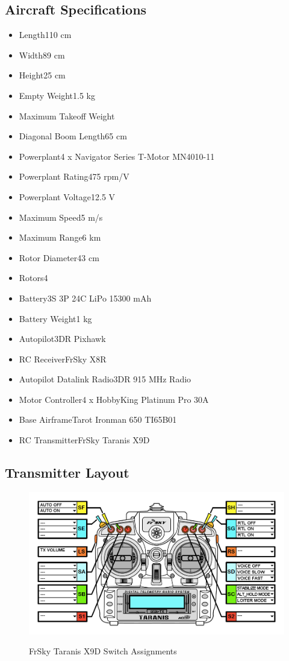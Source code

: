 \documentclass{report}
\begin{document}
		\subsection{Aircraft Specifications}
			\begin{itemize}
				\item Length\hfill110 cm
				\item Width\hfill89 cm
				\item Height\hfill25 cm
				\item Empty Weight\hfill1.5 kg
				\item Maximum Takeoff Weight\hfill
				\item Diagonal Boom Length\hfill65 cm
				\item Powerplant\hfill 4 x Navigator Series T-Motor MN4010-11
				\item Powerplant Rating\hfill475 rpm/V
				\item Powerplant Voltage\hfill12.5 V
				\item Maximum Speed\hfill 5 m/s
				\item Maximum Range\hfill 6 km
				\item Rotor Diameter\hfill 43 cm
				\item Rotors\hfill4
				\item Battery\hfill 3S 3P 24C \gls{LiPo} 15300 mAh
				\item Battery Weight\hfill 1 kg
				\item Autopilot\hfill3DR Pixhawk
				\item RC Receiver\hfill FrSky X8R
				\item Autopilot Datalink Radio\hfill 3DR 915 MHz Radio
				\item Motor Controller\hfill 4 x HobbyKing Platinum Pro 30A
				\item Base Airframe\hfill Tarot Ironman 650 TI65B01
				\item RC Transmitter\hfill FrSky Taranis X9D
			\end{itemize}
		\subsection{Transmitter Layout}
			\begin{figure}[ht]
				\centering
				\caption{FrSky Taranis X9D Switch Assignments}
				\includegraphics[width=\textwidth]{taranis_layout.png}
				\label{fig:tx_layout}
			\end{figure}
\end{document}
